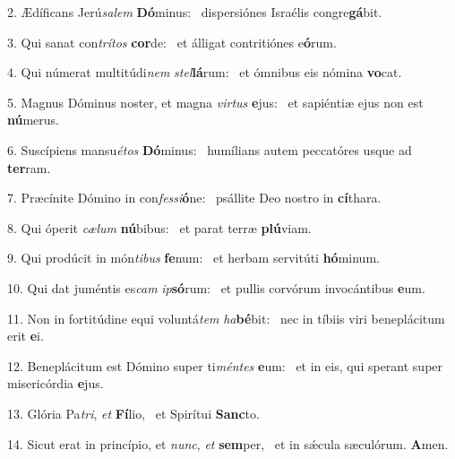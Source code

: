 2. Ædíficans Jerú\textit{sa}\textit{lem} \textbf{Dó}minus: \ast\  dispersiónes Israélis congre\textbf{gá}bit.\

3. Qui sanat con\textit{trí}\textit{tos} \textbf{cor}de: \ast\  et álligat contritiónes e\textbf{ó}rum.\

4. Qui númerat multitúdi\textit{nem} \textit{stel}\textbf{lá}rum: \ast\  et ómnibus eis nómina \textbf{vo}cat.\

5. Magnus Dóminus noster, et magna \textit{vir}\textit{tus} \textbf{e}jus: \ast\  et sapiéntiæ ejus non est \textbf{nú}merus.\

6. Suscípiens mansu\textit{é}\textit{tos} \textbf{Dó}minus: \ast\  humílians autem peccatóres usque ad \textbf{ter}ram.\

7. Præcínite Dómino in con\textit{fes}\textit{si}\textbf{ó}ne: \ast\  psállite Deo nostro in \textbf{cí}thara.\

8. Qui óperit \textit{cæ}\textit{lum} \textbf{nú}bibus: \ast\  et parat terræ \textbf{plú}viam.\

9. Qui prodúcit in món\textit{ti}\textit{bus} \textbf{fe}num: \ast\  et herbam servitúti \textbf{hó}minum.\

10. Qui dat juméntis es\textit{cam} \textit{ip}\textbf{só}rum: \ast\  et pullis corvórum invocántibus \textbf{e}um.\

11. Non in fortitúdine equi voluntá\textit{tem} \textit{ha}\textbf{bé}bit: \ast\  nec in tíbiis viri beneplácitum erit \textbf{e}i.\

12. Beneplácitum est Dómino super ti\textit{mén}\textit{tes} \textbf{e}um: \ast\  et in eis, qui sperant super misericórdia \textbf{e}jus.\

13. Glória Pa\textit{tri}, \textit{et} \textbf{Fí}lio, \ast\  et Spirítui \textbf{Sanc}to.\

14. Sicut erat in princípio, et \textit{nunc}, \textit{et} \textbf{sem}per, \ast\  et in sǽcula sæculórum. \textbf{A}men.\

